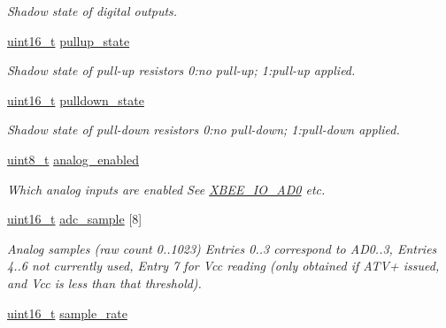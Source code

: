 \begin{DoxyCompactItemize}
\begin{DoxyCompactList}\small\item\em Shadow state of digital outputs. \end{DoxyCompactList}\item 
\hypertarget{group__xbee__io_gae74f9326ff51e03bd7ae5d2c85c08f9e}{\hyperlink{group__hal_ga5a8b2dc9e45a9ee81a94ef304fb62505}{uint16\-\_\-t} \hyperlink{group__xbee__io_gae74f9326ff51e03bd7ae5d2c85c08f9e}{pullup\-\_\-state}}\label{group__xbee__io_gae74f9326ff51e03bd7ae5d2c85c08f9e}

\begin{DoxyCompactList}\small\item\em Shadow state of pull-\/up resistors 0\-:no pull-\/up; 1\-:pull-\/up applied. \end{DoxyCompactList}\item 
\hypertarget{group__xbee__io_gab7b8b762841906ebf44fe90a3194d20c}{\hyperlink{group__hal_ga5a8b2dc9e45a9ee81a94ef304fb62505}{uint16\-\_\-t} \hyperlink{group__xbee__io_gab7b8b762841906ebf44fe90a3194d20c}{pulldown\-\_\-state}}\label{group__xbee__io_gab7b8b762841906ebf44fe90a3194d20c}

\begin{DoxyCompactList}\small\item\em Shadow state of pull-\/down resistors 0\-:no pull-\/down; 1\-:pull-\/down applied. \end{DoxyCompactList}\item 
\hyperlink{group__hal_gae1affc9ca37cfb624959c866a73f83c2}{uint8\-\_\-t} \hyperlink{group__xbee__io_ga8473837f97f54ee29f09cd8f9c15e084}{analog\-\_\-enabled}
\begin{DoxyCompactList}\small\item\em Which analog inputs are enabled See \hyperlink{group__xbee__io_gafc56816e62b0dd0a8d981b08f5f29651}{X\-B\-E\-E\-\_\-\-I\-O\-\_\-\-A\-D0} etc. \end{DoxyCompactList}\item 
\hyperlink{group__hal_ga5a8b2dc9e45a9ee81a94ef304fb62505}{uint16\-\_\-t} \hyperlink{group__xbee__io_ga51a638af480039b3c6578b36b5ad44f0}{adc\-\_\-sample} \mbox{[}8\mbox{]}
\begin{DoxyCompactList}\small\item\em Analog samples (raw count 0..1023) Entries 0..3 correspond to A\-D0..3, Entries 4..6 not currently used, Entry 7 for Vcc reading (only obtained if A\-T\-V+ issued, and Vcc is less than that threshold). \end{DoxyCompactList}\item 
\hypertarget{group__xbee__io_ga55f35df829432e5948124c79e1cda4d9}{\hyperlink{group__hal_ga5a8b2dc9e45a9ee81a94ef304fb62505}{uint16\-\_\-t} \hyperlink{group__xbee__io_ga55f35df829432e5948124c79e1cda4d9}{sample\-\_\-rate}}\label{group__xbee__io_ga55f35df829432e5948124c79e1cda4d9}


\end{DoxyCompactItemize}
